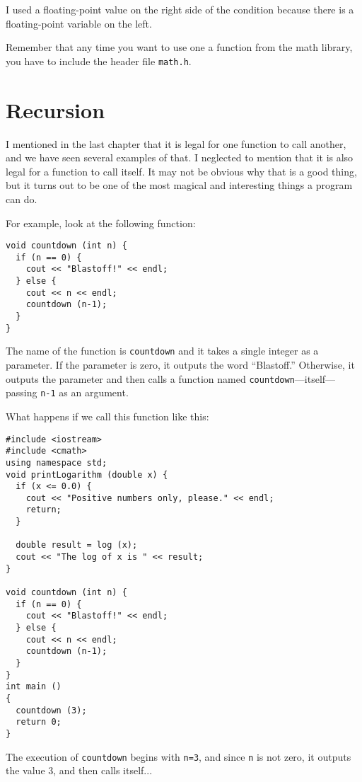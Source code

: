 I used a floating-point value on the right side of the condition
because there is a floating-point variable on the left.

Remember that any time you want to use one a function from the math
library, you have to include the header file {\tt math.h}.

\section{Recursion}
\label{recursion}

I mentioned in the last chapter that it is legal for one function to
call another, and we have seen several examples of that.  I neglected
to mention that it is also legal for a function to call itself.  It
may not be obvious why that is a good thing, but it turns out to be
one of the most magical and interesting things a program can do.

For example, look at the following function:

\begin{lstlisting}
void countdown (int n) {
  if (n == 0) {
    cout << "Blastoff!" << endl;
  } else {
    cout << n << endl;
    countdown (n-1);
  }
}
\end{lstlisting}
%
The name of the function is {\tt countdown} and it takes a single
integer as a parameter.  If the parameter is zero, it outputs
the word ``Blastoff.''  Otherwise, it outputs the parameter and
then calls a function named {\tt countdown}---itself---passing
{\tt n-1} as an argument.

What happens if we call this function like this:

\begin{lstlisting}
#include <iostream>
#include <cmath>
using namespace std;
void printLogarithm (double x) {
  if (x <= 0.0) {
    cout << "Positive numbers only, please." << endl;
    return;
  }

  double result = log (x);
  cout << "The log of x is " << result;
}

void countdown (int n) {
  if (n == 0) {
    cout << "Blastoff!" << endl;
  } else {
    cout << n << endl;
    countdown (n-1);
  }
}
int main ()
{
  countdown (3);
  return 0;
}
\end{lstlisting}
%
The execution of {\tt countdown} begins with {\tt n=3}, and
since {\tt n} is not zero, it outputs the value 3, and then
calls itself...

